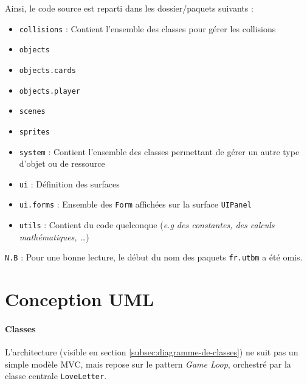 \documentclass[paper=a4,fontsize=12pt,titlepage]{scrartcl}
\begin{document}
    Ainsi, le code source est reparti dans les dossier/paquets suivants :
    \begin{itemize}
        \item \verb|collisions| : Contient l'ensemble des classes pour gérer les collisions
        \item \verb|objects|
        \item \verb|objects.cards|
        \item \verb|objects.player|
        \item \verb|scenes|
        \item \verb|sprites|
        \item \verb|system| : Contient l'ensemble des classes permettant de gérer un autre type d'objet ou de ressource
        \item \verb|ui| : Définition des surfaces
        \item \verb|ui.forms| : Ensemble des \verb|Form| affichées sur la surface \verb|UIPanel|
        \item \verb|utils| : Contient du code quelconque (\textit{e.g des constantes, des calculs mathématiques, \ldots})
    \end{itemize}

    \texttt{N.B} : Pour une bonne lecture, le début du nom des paquets \verb|fr.utbm| a été omis.
    \newpage
    \section{Conception UML}\label{sec:diagrammes-uml}

    \paragraph{Classes} L'architecture (visible en section \ref{subsec:diagramme-de-classes}) ne suit pas un simple modèle MVC,
    mais repose sur le pattern \textit{Game Loop}, orchestré par la classe centrale \texttt{LoveLetter}.
\end{document}
